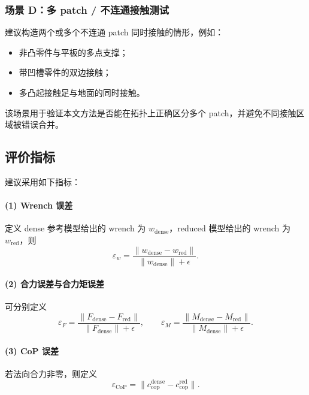 \documentclass[UTF8,a4paper,11pt]{ctexart}
\begin{document}
\subsubsection{场景 D：多 patch / 不连通接触测试}

建议构造两个或多个不连通 patch 同时接触的情形，例如：
\begin{itemize}[leftmargin=2em]
    \item 非凸零件与平板的多点支撑；
    \item 带凹槽零件的双边接触；
    \item 多凸起接触足与地面的同时接触。
\end{itemize}

该场景用于验证本文方法是否能在拓扑上正确区分多个 patch，并避免不同接触区域被错误合并。

\subsection{评价指标}

建议采用如下指标：

\paragraph{(1) Wrench 误差}
定义 dense 参考模型给出的 wrench 为 $w_{\mathrm{dense}}$，reduced 模型给出的 wrench 为 $w_{\mathrm{red}}$，则
\begin{equation}
\varepsilon_w = \frac{\|w_{\mathrm{dense}}-w_{\mathrm{red}}\|}{\|w_{\mathrm{dense}}\|+\epsilon}.
\end{equation}

\paragraph{(2) 合力误差与合力矩误差}
可分别定义
\begin{equation}
\varepsilon_F = \frac{\|F_{\mathrm{dense}}-F_{\mathrm{red}}\|}{\|F_{\mathrm{dense}}\|+\epsilon},
\qquad
\varepsilon_M = \frac{\|M_{\mathrm{dense}}-M_{\mathrm{red}}\|}{\|M_{\mathrm{dense}}\|+\epsilon}.
\end{equation}

\paragraph{(3) CoP 误差}
若法向合力非零，则定义
\begin{equation}
\varepsilon_{\mathrm{CoP}} = \|c_{\mathrm{cop}}^{\mathrm{dense}}-c_{\mathrm{cop}}^{\mathrm{red}}\|.
\end{equation}
\end{document}
